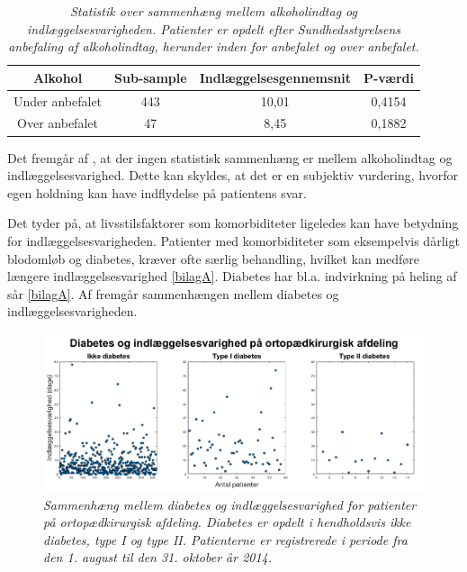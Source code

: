 \begin{table}[H]
\centering
\begin{tabular}{|c|c|c|c|}
\hline
\textbf{Alkohol} & \textbf{Sub-sample} & \textbf{Indlæggelsesgennemsnit} & \textbf{P-værdi} \\ \hline
Under anbefalet   & 443                 & 10,01                           & 0,4154           \\ \hline
Over anbefalet    & 47                  & 8,45                            & 0,1882           \\ \hline
\end{tabular}
\caption{\textit{Statistik over sammenhæng mellem alkoholindtag og indlæggelsesvarigheden. Patienter er opdelt efter Sundhedsstyrelsens anbefaling af alkoholindtag, herunder inden for anbefalet og over anbefalet.}}
\label{alkoholindlaegtab}
\end{table}

\noindent
Det fremgår af , at der ingen statistisk sammenhæng er mellem alkoholindtag og indlæggelsesvarighed. Dette kan skyldes, at det er en subjektiv vurdering, hvorfor egen holdning kan have indflydelse på patientens svar. 

Det tyder på, at livsstilsfaktorer som komorbiditeter ligeledes kan have betydning for indlæggelsesvarigheden. Patienter med komorbiditeter som eksempelvis dårligt blodomløb og diabetes, kræver ofte særlig behandling, hvilket kan medføre længere indlæggelsesvarighed \ref{bilagA}. Diabetes har bl.a. indvirkning på heling af sår \ref{bilagA}. Af  fremgår sammenhængen mellem diabetes og indlæggelsesvarigheden. 

\begin{figure}[H]
	\centering
	\includegraphics[scale=0.25]{figures/diabetesogindlaeg}
	\caption{\textit{Sammenhæng mellem diabetes og indlæggelsesvarighed for patienter på ortopædkirurgisk afdeling. Diabetes er opdelt i hendholdsvis ikke diabetes, type I og type II. Patienterne er registrerede i periode fra den 1. august til den 31. oktober år 2014.}}
	\label{diabetesogindlaeggelse}
\end{figure}

